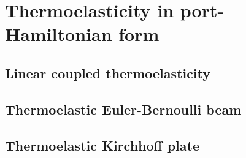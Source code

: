 \chapter{Thermoelasticity in port-Hamiltonian form}

\section{Linear coupled thermoelasticity}

\section{Thermoelastic Euler-Bernoulli beam}

\section{Thermoelastic Kirchhoff plate}
